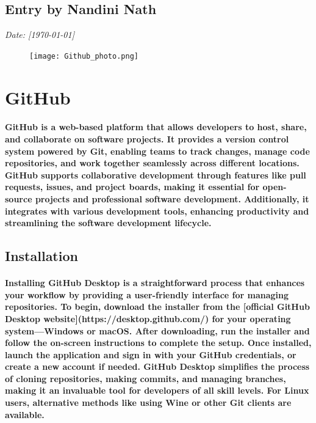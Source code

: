 \documentclass[12pt, a4paper]{article}
\begin{document}
\subsection*{Entry by Nandini Nath}
\textit{Date: [\today]}\\

\begin{figure}[h!]
   \centering
    \texttt{[image: Github\_photo.png]}
\end{figure}

\vspace{-1cm} %

\section*{\Huge{GitHub}}
\paragraph{GitHub is a web-based platform that allows developers to host, share, and collaborate on software projects. It provides a version control system powered by Git, enabling teams to track changes, manage code repositories, and work together seamlessly across different locations. GitHub supports collaborative development through features like pull requests, issues, and project boards, making it essential for open-source projects and professional software development. Additionally, it integrates with various development tools, enhancing productivity and streamlining the software development lifecycle.}

\subsection*{Installation}
\paragraph{Installing GitHub Desktop is a straightforward process that enhances your workflow by providing a user-friendly interface for managing repositories. To begin, download the installer from the [official GitHub Desktop website](https://desktop.github.com/) for your operating system—Windows or macOS. After downloading, run the installer and follow the on-screen instructions to complete the setup. Once installed, launch the application and sign in with your GitHub credentials, or create a new account if needed. GitHub Desktop simplifies the process of cloning repositories, making commits, and managing branches, making it an invaluable tool for developers of all skill levels. For Linux users, alternative methods like using Wine or other Git clients are available.}
\end{document}
